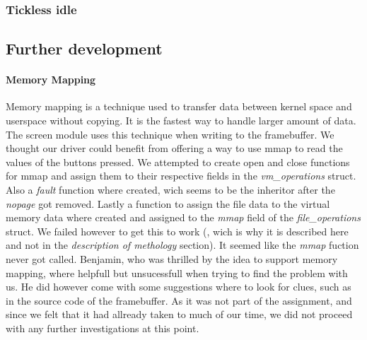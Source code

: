 \subsubsection{Tickless idle}

\subsection{Further development}
\paragraph{Memory Mapping}
Memory mapping is a technique used to transfer data between kernel space and userspace without copying. It is the fastest way to handle larger amount of data. The screen module uses this technique when writing to the framebuffer. We thought our driver could benefit from offering a way to use mmap to read the values of the buttons pressed. We attempted to create open and close functions for mmap and assign them to their respective fields in the \emph{vm\_operations} struct. Also a \emph{fault} function where created, wich seems to be the inheritor after the \emph{nopage} got removed. Lastly a function to assign the file data to the virtual memory data where created and assigned to the \emph{mmap} field of the \emph{file\_operations} struct. We failed however to get this to work (, wich is why it is described here and not in the \emph{description of methology} section). It seemed like the \emph{mmap} fuction never got called. Benjamin, who was thrilled by the idea to support memory mapping, where helpfull but unsucessfull when trying to find the problem with us. He did however come with some suggestions where to look for clues, such as in the source code of the framebuffer. As it was not part of the assignment, and since we felt that it had allready taken to much of our time, we did not proceed with any further investigations at this point.
